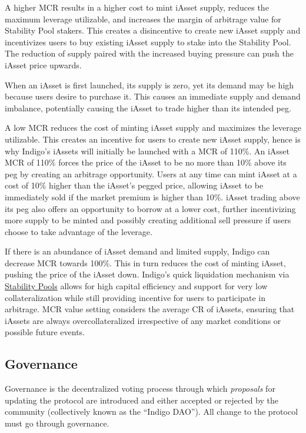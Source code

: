 \documentclass{article}
\begin{document}
\begin{sloppypar}
A higher MCR results in a higher cost to mint iAsset supply, reduces the
maximum leverage utilizable, and increases the margin of arbitrage value
for Stability Pool stakers. This creates a disincentive to create new
iAsset supply and incentivizes users to buy existing iAsset supply to
stake into the Stability Pool. The reduction of supply paired with the
increased buying pressure can push the iAsset price upwards.

When an iAsset is first launched, its supply is zero, yet its demand may
be high because users desire to purchase it. This causes an immediate
supply and demand imbalance, potentially causing the iAsset to trade
higher than its intended peg.

A low MCR reduces the cost of minting iAsset supply and maximizes the
leverage utilizable. This creates an incentive for users to create new
iAsset supply, hence is why Indigo's iAssets will initially be launched
with a MCR of 110\%. An iAsset MCR of 110\% forces the price of the
iAsset to be no more than 10\% above its peg by creating an arbitrage
opportunity. Users at any time can mint iAsset at a cost of 10\% higher
than the iAsset's pegged price, allowing iAsset to be immediately sold
if the market premium is higher than 10\%. iAsset trading above its peg
also offers an opportunity to borrow at a lower cost, further
incentivizing more supply to be minted and possibly creating additional
sell pressure if users choose to take advantage of the leverage.

If there is an abundance of iAsset demand and limited supply, Indigo can
decrease MCR towards 100\%. This in turn reduces the cost of minting
iAsset, pushing the price of the iAsset down. Indigo's quick liquidation
mechanism via \protect\hyperlink{stability-pools}{Stability Pools}
allows for high capital efficiency and support for very low
collateralization while still providing incentive for users to
participate in arbitrage. MCR value setting considers the average CR of
iAssets, ensuring that iAssets are always overcollateralized
irrespective of any market conditions or possible future events.

\hypertarget{governance}{%
\subsection{Governance}\label{governance}}

Governance is the decentralized voting process through which
\emph{proposals} for updating the protocol are introduced and either
accepted or rejected by the community (collectively known as the
``Indigo DAO''). All change to the protocol must go through governance.


\end{sloppypar}
\end{document}
